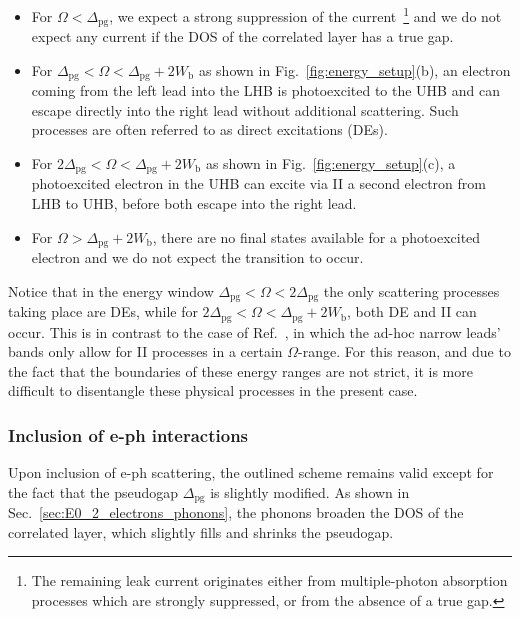 \documentclass[aps,prb,groupedaddress,showpacs,twocolumn,superscriptaddress,10pt]{revtex4-2}
\begin{document}
\begin{itemize}
\item For $\Omega<\Delta_{\text{pg}}$, 
we expect a strong suppression of the current~\footnote{The remaining leak current originates either from multiple-photon absorption processes which are strongly suppressed, or from the absence of a true gap.} and we do not expect any current if the DOS of the correlated layer has a true gap.
\item For $\Delta_{\text{pg}}<\Omega<\Delta_{\text{pg}}+2W_{\text{b}}$ as shown in Fig.~\ref{fig:energy_setup}(b), an electron coming from the left lead into the LHB is photoexcited to the UHB and can escape directly into the right lead without additional scattering.  Such processes are often referred to as direct excitations (DEs).
\item For $2\Delta_{\text{pg}}<\Omega<\Delta_{\text{pg}}+2W_{\text{b}}$ as shown in Fig.~\ref{fig:energy_setup}(c), a photoexcited electron in the UHB can excite via II a second electron from LHB to UHB, before both escape into the right lead.
\item For $\Omega>\Delta_{\text{pg}}+2W_{\text{b}}$, there are no final states available for a photoexcited electron and we do not expect the transition to occur. 
\end{itemize}
% 
Notice that in the energy window $\Delta_{\text{pg}}<\Omega<2\Delta_{\text{pg}}$ the only scattering processes taking place are DEs, while for $2\Delta_{\text{pg}}<\Omega<\Delta_{\text{pg}}+2W_{\text{b}}$, both DE and II can occur. This is in contrast to the case of Ref.~\cite{so.do.18}, in which the ad-hoc narrow leads' bands only allow for II processes in a certain $\Omega$-range. For this reason, and due to the fact that the boundaries of these energy ranges are not strict, it is more difficult to disentangle these physical processes in the present case.

\subsubsection{Inclusion of e-ph interactions}
\label{sec:scheme_electrons_phonons}  

Upon inclusion of e-ph scattering, the outlined scheme remains valid except for the fact that  the pseudogap $\Delta_{\text{pg}}$ is slightly modified. As shown in Sec.~\ref{sec:E0_2_electrons_phonons}, the phonons broaden the DOS of the correlated layer, which slightly fills and shrinks the pseudogap.
 
\end{document}

